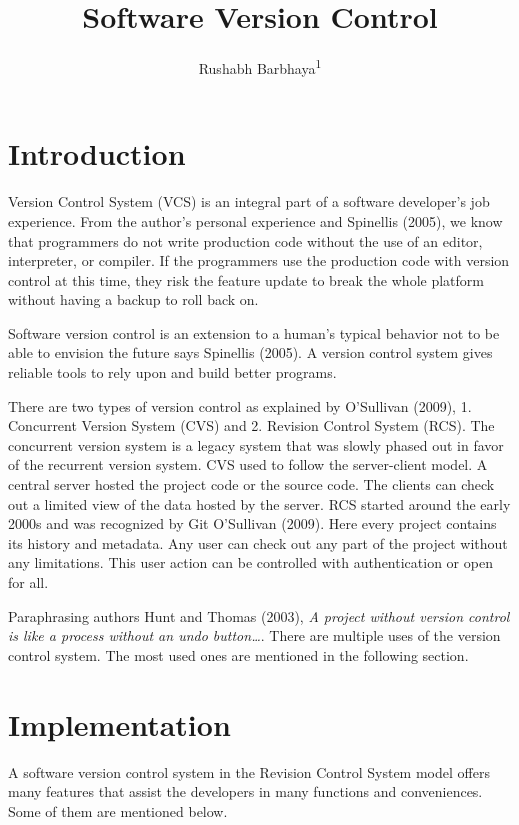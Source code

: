 \documentclass[
  man]{apa7}
\title{Software Version Control}
\author{Rushabh Barbhaya\textsuperscript{1}}
\date{}
\affiliation{\vspace{0.5cm}\textsuperscript{1} Harrisburg University of Science and Technology}
\begin{document}
\maketitle

\hypertarget{introduction}{%
\section{Introduction}\label{introduction}}

Version Control System (VCS) is an integral part of a software developer's job experience. From the author's personal experience and Spinellis (2005), we know that programmers do not write production code without the use of an editor, interpreter, or compiler. If the programmers use the production code with version control at this time, they risk the feature update to break the whole platform without having a backup to roll back on.

Software version control is an extension to a human's typical behavior not to be able to envision the future says Spinellis (2005). A version control system gives reliable tools to rely upon and build better programs.

There are two types of version control as explained by O'Sullivan (2009), 1. Concurrent Version System (CVS) and 2. Revision Control System (RCS). The concurrent version system is a legacy system that was slowly phased out in favor of the recurrent version system. CVS used to follow the server-client model. A central server hosted the project code or the source code. The clients can check out a limited view of the data hosted by the server. RCS started around the early 2000s and was recognized by Git O'Sullivan (2009). Here every project contains its history and metadata. Any user can check out any part of the project without any limitations. This user action can be controlled with authentication or open for all.

Paraphrasing authors Hunt and Thomas (2003), \emph{A project without version control is like a process without an undo button\ldots{}}. There are multiple uses of the version control system. The most used ones are mentioned in the following section.

\hypertarget{implementation}{%
\section{Implementation}\label{implementation}}

A software version control system in the Revision Control System model offers many features that assist the developers in many functions and conveniences. Some of them are mentioned below.
\end{document}
